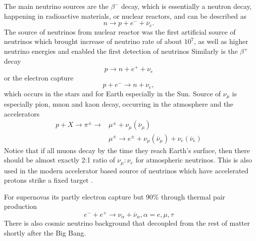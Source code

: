 The main neutrino sources \cite{FundamentalsOfNeutrinoPhysics.pdf} are the $\beta^-$ decay, which is essentially a neutron decay, happening in radioactive materials, or nuclear reactors, and can be described as
\begin{equation}
n\rightarrow p+e^-+\overline{\nu}_e.
\end{equation}
The source of neutrinos from nuclear reactor was the first artificial source of neutrinos which brought increase of neutrino rate of about $10^7$, as well as higher neutrino energies and enabled the first detection of neutrinos \cite{NeutrinoPhysicsCowanReines.pdf}
Similarly is the $\beta^+$ decay
\begin{equation}
p\rightarrow n+e^++\nu_e
\end{equation}
or the electron capture
\begin{equation}
p+e^-\rightarrow n+\nu_e,
\end{equation}
which occurs in the stars and for Earth especially in the Sun.
Source of $\nu_\mu$ is especially pion, muon and kaon decay, occurring in the atmosphere and the accelerators
\begin{align}
p+X \rightarrow \pi^\pm \rightarrow &\mu^\pm + \nu_\mu\left(\overline{\nu}_\mu\right) \\
 & \mu^\pm \rightarrow e^\pm + \nu_\mu\left(\overline{\nu}_\mu\right) + \nu_e\left(\overline{\nu}_e\right)
\end{align}
Notice that if all muons decay by the time they reach Earth's surface, then there should be almost exactly 2:1 ratio of $\nu_\mu : \nu_e$ for atmospheric neutrinos. This is also used in the modern accelerator based source of neutrinos which have accelerated protons strike a fixed target \cite{GoodmanAdvancesInNeutrinoPhysics.pdf}\cite{SchwartzAccelerators.pdf}.

For supernovas its partly electron capture but 90\% through thermal pair production
\begin{equation}
e^-+e^+\rightarrow\nu_\alpha+\overline{\nu}_\alpha, \alpha=e,\mu,\tau
\end{equation}
There is also cosmic neutrino background that decoupled from the rest of matter shortly after the Big Bang.


